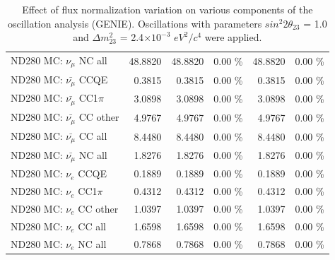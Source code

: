 \begin{table}
\begin{tabular}{| l | r | r  r | r  r |}
                                          ND280 MC: $\nu_{\mu}$ NC all &         48.8820 &         48.8820 &  0.00 \%  &         48.8820 &  0.00 \%  \\ 
                                      ND280 MC: $\bar{\nu_{\mu}}$ CCQE &          0.3815 &          0.3815 &  0.00 \%  &          0.3815 &  0.00 \%  \\ 
                                  ND280 MC: $\bar{\nu_{\mu}}$ CC1$\pi$ &          3.0898 &          3.0898 &  0.00 \%  &          3.0898 &  0.00 \%  \\ 
                                  ND280 MC: $\bar{\nu_{\mu}}$ CC other &          4.9767 &          4.9767 &  0.00 \%  &          4.9767 &  0.00 \%  \\ 
                                    ND280 MC: $\bar{\nu_{\mu}}$ CC all &          8.4480 &          8.4480 &  0.00 \%  &          8.4480 &  0.00 \%  \\ 
                                    ND280 MC: $\bar{\nu_{\mu}}$ NC all &          1.8276 &          1.8276 &  0.00 \%  &          1.8276 &  0.00 \%  \\ 
                                              ND280 MC: $\nu_{e}$ CCQE &          0.1889 &          0.1889 &  0.00 \%  &          0.1889 &  0.00 \%  \\ 
                                          ND280 MC: $\nu_{e}$ CC1$\pi$ &          0.4312 &          0.4312 &  0.00 \%  &          0.4312 &  0.00 \%  \\ 
                                          ND280 MC: $\nu_{e}$ CC other &          1.0397 &          1.0397 &  0.00 \%  &          1.0397 &  0.00 \%  \\ 
                                            ND280 MC: $\nu_{e}$ CC all &          1.6598 &          1.6598 &  0.00 \%  &          1.6598 &  0.00 \%  \\ 
                                            ND280 MC: $\nu_{e}$ NC all &          0.7868 &          0.7868 &  0.00 \%  &          0.7868 &  0.00 \%  \\ 
\hline
\end{tabular}
\caption{ 
  Effect of flux normalization variation
  on various components of the oscillation analysis (GENIE).
  Oscillations with parameters $sin^{2}2\theta_{23}$ = 1.0 and $\Delta m^{2}_{23}$ = 2.4$\times10^{-3}$ $eV^{2}/c^{4}$ were applied.  
}
\label{tab:genie_flux_norm}
\end{table}


%
%
%
%

